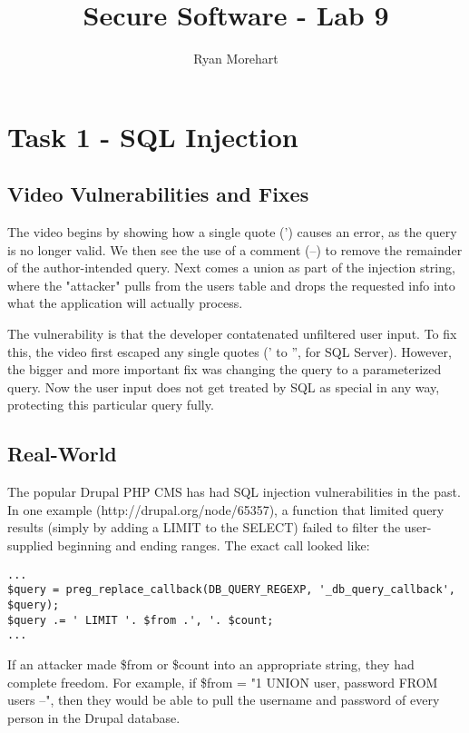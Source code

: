 \documentclass{article}
\begin{document}
\pagestyle{fancy}

\title{Secure Software - Lab 9}
\author{Ryan Morehart}
\maketitle

\section{Task 1 - SQL Injection}
\subsection{Video Vulnerabilities and Fixes}
\par The video begins by showing how a single quote (') causes an error, as the query is no longer valid. We then see the use of a comment (--) to remove the remainder of the author-intended query. Next comes a union as part of the injection string, where the "attacker" pulls from the users table and drops the requested info into what the application will actually process.

\par The vulnerability is that the developer contatenated unfiltered user input. To fix this, the video first escaped any single quotes (' to '', for SQL Server). However, the bigger and more important fix was changing the query to a parameterized query. Now the user input does not get treated by SQL as special in any way, protecting this particular query fully.

\subsection{Real-World}
\par The popular Drupal PHP CMS has had SQL injection vulnerabilities in the past. In one example (http://drupal.org/node/65357), a function that limited query results (simply by adding a LIMIT to the SELECT) failed to filter the user-supplied beginning and ending ranges. The exact call looked like:
\begin{verbatim}
...
$query = preg_replace_callback(DB_QUERY_REGEXP, '_db_query_callback', $query);
$query .= ' LIMIT '. $from .', '. $count;
...
\end{verbatim}

\par If an attacker made \$from or \$count into an appropriate string, they had complete freedom. For example, if \$from = "1 UNION user, password FROM users --", then they would be able to pull the username and password of every person in the Drupal database.
\end{document}
